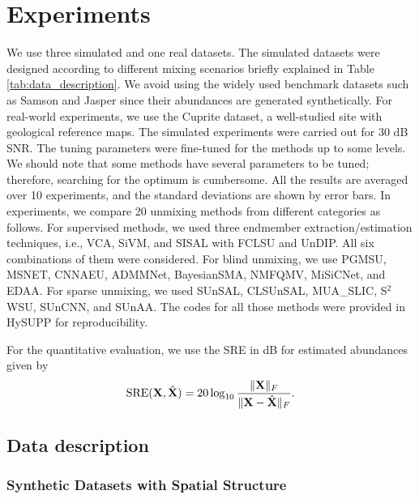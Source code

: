 \section{Experiments}

We use three simulated and one real datasets. The simulated datasets were designed according to different mixing scenarios briefly explained in Table \ref{tab:data_description}. We avoid using the widely used benchmark datasets such as Samson and Jasper since their abundances are generated synthetically. For real-world experiments, we use the Cuprite dataset, a well-studied site with geological reference maps. The simulated experiments were carried out for 30 dB SNR. The tuning parameters were fine-tuned for the methods up to some levels. We should note that some methods have several parameters to be tuned; therefore, searching for the optimum is cumbersome. All the results are averaged over 10 experiments, and the standard deviations are shown by error bars. In experiments, we compare 20 unmixing methods from different categories as follows. For supervised methods, we used three endmember extraction/estimation techniques, i.e., VCA, SiVM, and SISAL with FCLSU and UnDIP. All six combinations of them were considered. For blind unmixing, we use PGMSU, MSNET, CNNAEU, ADMMNet, BayesianSMA, NMFQMV, MiSiCNet, and EDAA. For sparse unmixing, we used SUnSAL, CLSUnSAL, MUA\_SLIC, S$^2$WSU, SUnCNN, and SUnAA. The codes for all those methods were provided in  HySUPP for reproducibility.  

For the quantitative evaluation, we use the SRE in dB for estimated abundances given by
\begin{equation}
    \text{SRE}(\mathbf X, \hat{\mathbf X})=20\log_{10}\frac{\|{\mathbf X}\|_F}{\|{\mathbf X}-\hat{\mathbf X}\|_F}.
\end{equation}

\subsection{Data description}

\subsubsection{Synthetic Datasets with Spatial Structure}


